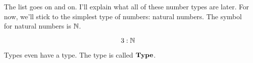 The list goes on and on. I'll explain what all of these number types are later.
For now, we'll stick to the simplest type of numbers: natural numbers. The
symbol for natural numbers is $\mathbb{N}$.

\begin{equation}
    3 : \mathbb{N}
\end{equation}

Types even have a type. The type is called $\mathbf{Type}$.



